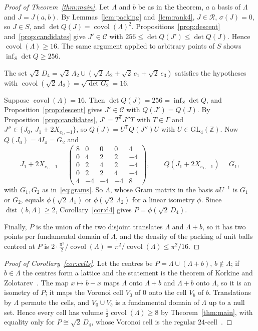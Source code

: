 \documentclass[11pt]{amsart}
\theoremstyle{definition}
\theoremstyle{remark}
\numberwithin{equation}{section}
\numberwithin{table}{section}
\numberwithin{figure}{section}
\newcommand{\Z}{\mathbb{Z}}
\newcommand{\Rk}{\mathcal{R}}
\newcommand{\covol}{\operatorname{covol}}
\newcommand{\dist}{\operatorname{dist}}
\newcommand{\GL}{\mathrm{GL}}
\newcommand{\cand}{\mathcal{C}}
\begin{document}
\begin{proof}[Proof of Theorem~\ref{thm:main}]
Let $\Lambda$ and $b$ be as in the theorem, $a$ a basis of $\Lambda$ and $J=J(a,b)$. By Lemmas~\ref{lem:packing} and~\ref{lem:rank4}, $J\in\Rk$, $\sigma(J)=0$, so $J\in S$, and $\det Q(J)=\covol(\Lambda)^2$. Propositions~\ref{prop:descent} and~\ref{prop:candidates} give $J'\in\cand$ with $256\le\det Q(J')\le\det Q(J)$. Hence $\covol(\Lambda)\ge16$. The same argument applied to arbitrary points of $S$ shows $\inf_S\det Q\ge256$.

The set $\sqrt2\,D_4=\sqrt2\,\Lambda_2\cup(\sqrt2\,\Lambda_2+\sqrt2\,e_1+\sqrt2\,e_3)$ satisfies the hypotheses with $\covol(\sqrt2\,\Lambda_2)=\sqrt{\det G_2}=16$.

Suppose $\covol(\Lambda)=16$. Then $\det Q(J)=256=\inf_S\det Q$, and Proposition~\ref{prop:descent} gives $J'\in\cand$ with $Q(J')=Q(J)$. By Proposition~\ref{prop:candidates}, $J'=T^{\mathsf T}J''T$ with $T\in\Gamma$ and $J''\in\{J_0,\ J_1+2X_{e_1,-1}\}$, so $Q(J)=U^{\mathsf T}Q(J'')U$ with $U\in\GL_4(\Z)$. Now $Q(J_0)=4I_4=G_2$ and
\[
J_1+2X_{e_1,-1}=\begin{pmatrix}8&0&0&0&4\\0&4&2&2&-4\\0&2&4&2&-4\\0&2&2&4&-4\\4&-4&-4&-4&8\end{pmatrix},\qquad Q(J_1+2X_{e_1,-1})=G_1,
\]
with $G_1,G_2$ as in~\eqref{eq:grams}. So $\Lambda$, whose Gram matrix in the basis $aU^{-1}$ is $G_1$ or $G_2$, equals $\phi(\sqrt2\,\Lambda_1)$ or $\phi(\sqrt2\,\Lambda_2)$ for a linear isometry $\phi$. Since $\dist(b,\Lambda)\ge2$, Corollary~\ref{cor:d4} gives $P=\phi(\sqrt2\,D_4)$.

Finally, $P$ is the union of the two disjoint translates $\Lambda$ and $\Lambda+b$, so it has two points per fundamental domain of $\Lambda$, and the density of the packing of unit balls centred at $P$ is $2\cdot\frac{\pi^2}{2}/\covol(\Lambda)=\pi^2/\covol(\Lambda)\le\pi^2/16$.
\end{proof}

\begin{proof}[Proof of Corollary~\ref{cor:cells}]
Let the centres be $P=\Lambda\cup(\Lambda+b)$, $b\notin\Lambda$; if $b\in\Lambda$ the centres form a lattice and the statement is the theorem of Korkine and Zolotarev~\cite{KZ1877}. The map $x\mapsto b-x$ maps $\Lambda$ onto $\Lambda+b$ and $\Lambda+b$ onto $\Lambda$, so it is an isometry of $P$; it maps the Voronoi cell $V_0$ of $0$ onto the cell $V_b$ of $b$. Translations by $\Lambda$ permute the cells, and $V_0\cup V_b$ is a fundamental domain of $\Lambda$ up to a null set. Hence every cell has volume $\frac12\covol(\Lambda)\ge8$ by Theorem~\ref{thm:main}, with equality only for $P\cong\sqrt2\,D_4$, whose Voronoi cell is the regular $24$-cell~\cite[Ch.~21]{CS1999}.
\end{proof}
\end{document}
